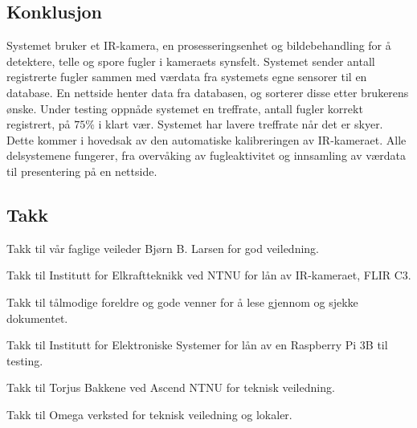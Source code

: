 \subsection{Konklusjon}
Systemet bruker et IR-kamera, en prosesseringsenhet og bildebehandling for å detektere, telle og spore fugler i kameraets synsfelt. 
Systemet sender antall registrerte fugler sammen med værdata fra systemets egne sensorer til en database.
En nettside henter data fra databasen, og sorterer disse etter brukerens ønske. 
Under testing oppnåde systemet en treffrate, antall fugler korrekt registrert, på $75\%$ i klart vær. 
Systemet har lavere treffrate når det er skyer.
Dette kommer i hovedsak av den automatiske kalibreringen av IR-kameraet. 
Alle delsystemene fungerer, fra overvåking av fugleaktivitet og innsamling av værdata til presentering på en nettside.


\subsection{Takk}

Takk til vår faglige veileder Bjørn B. Larsen for god veiledning.

Takk til Institutt for Elkraftteknikk ved NTNU for lån av IR-kameraet, FLIR C3. 

Takk til tålmodige foreldre og gode venner for å lese gjennom og sjekke dokumentet.

Takk til Institutt for Elektroniske Systemer for lån av en Raspberry Pi 3B til testing. 

Takk til Torjus Bakkene ved Ascend NTNU for teknisk veiledning.

Takk til Omega verksted for teknisk veiledning og lokaler. 
